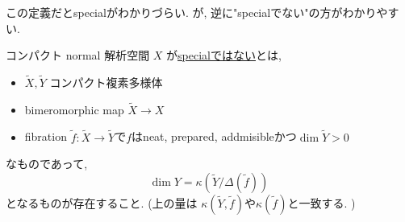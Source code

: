 \documentclass[dvipdfmx,a4paper,11pt]{article} %
\theoremstyle{definition}
\theoremstyle{remark}
\numberwithin{equation}{section}
\begin{document}
この定義だとspecialがわかりづらい. が, 逆に"specialでない"の方がわかりやすい. 
\begin{tcolorbox}[mybox]
コンパクト normal 解析空間 $X$ が\underline{specialではない}とは, 
\begin{itemize}
\item $\widetilde{X}, \widetilde{Y}$ コンパクト複素多様体
\item bimeromorphic map $\widetilde{X} \to X$
\item fibration $\widetilde{f} : \widetilde{X} \to \widetilde{Y}$で$f$はneat, prepared, addmisibleかつ$\dim \widetilde{Y} >0$
\end{itemize}
なものであって, 
$$
\dim Y= \kappa(\widetilde{Y}/\Delta(\widetilde{f})) $$
となるものが存在すること. (上の量は $\kappa(\widetilde{Y}, \widetilde{f}) $や$\kappa(\widetilde{f})$と一致する. )
\end{tcolorbox}
\end{document}
